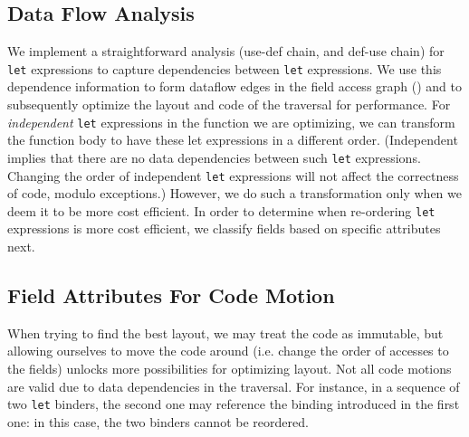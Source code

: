 \subsection{Data Flow Analysis}
\label{design:dfa}


We implement a straightforward analysis (use-def chain, and def-use chain) for \lstinline|let| expressions to capture dependencies between 
\lstinline|let| expressions. We use this dependence information to form dataflow edges in the field access graph ()
and to subsequently optimize the layout and code of the traversal for performance. For \textit{independent} \lstinline|let| expressions in the function we are optimizing, we can transform the function body to have these let expressions in a different order. 
(Independent implies that there are no data dependencies between such \lstinline|let| expressions. Changing the order of independent \lstinline|let| expressions will
not affect the correctness of
code, modulo exceptions.)
%
However, we do such a transformation only when we deem it to be more cost efficient. In order to determine 
when re-ordering \lstinline|let| expressions is more cost efficient, we classify fields based on specific attributes next.

\subsection{Field Attributes For Code Motion}
\label{subsec:attributes}


When trying to find the best layout, we may treat the code as immutable,
but allowing ourselves to move the code around (i.e. change the order of accesses to the fields)
unlocks more possibilities for optimizing layout.
Not all code motions are valid due to data dependencies in the traversal.
For instance, in a sequence of two \lstinline|let| binders, the second one may reference the binding introduced in the first one: in this case, the two binders cannot be reordered.

